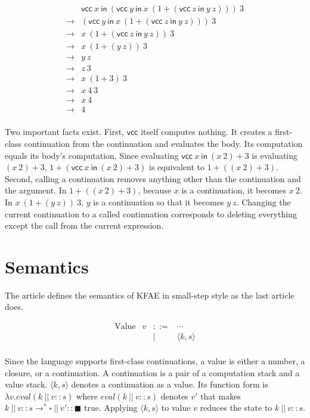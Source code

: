 \[
\begin{array}{cl}
& \textsf{vcc}\ x\ \textsf{in}\ (\textsf{vcc}\ y\ \textsf{in}\ x\
(1+(\textsf{vcc}\ z\ \textsf{in}\ y\ z)))\ 3 \\
\rightarrow & (\textsf{vcc}\ y\ \textsf{in}\ x\ (1+(\textsf{vcc}\ z\ \textsf{in}\
y\ z)))\ 3\\
\rightarrow & x\ (1+(\textsf{vcc}\ z\ \textsf{in}\ y\ z))\ 3\\
\rightarrow & x\ (1+(y\ z))\ 3 \\
\rightarrow & y\ z\\
\rightarrow & z\ 3 \\
\rightarrow & x\ (1+3)\ 3 \\
\rightarrow & x\ 4\ 3 \\
\rightarrow & x\ 4\\
\rightarrow & 4 \\
\end{array}
\]

Two important facts exist. First, $\textsf{vcc}$ itself computes nothing. It
creates a first-class continuation from the continuation and evaluates the body.
Its computation equals its body's computation. Since evaluating $\textsf{vcc}\ x\
\textsf{in}\ (x\ 2)+3$ is evaluating $(x\ 2)+3$, $1+(\textsf{vcc}\ x\
\textsf{in}\ (x\ 2)+3)$ is equivalent to $1+((x\ 2)+3)$. Second, calling a
continuation removes anything other than the continuation and the argument. In
$1+((x\ 2)+3)$, because $x$ is a continuation, it becomes $x\ 2$. In $x\ (1+(y\
z))\ 3$, $y$ is a continuation so that it becomes $y\ z$. Changing the current
continuation to a called continuation corresponds to deleting everything except
the call from the current expression.

\section{Semantics}

The article defines the semantics of KFAE in small-step style as the last article
does.

\[
\begin{array}{lrcl}
\text{Value} & v & ::= & \cdots \\
&& | & \langle k,s\rangle \\
\end{array}
\]

Since the language supports first-class continuations, a value is either a
number, a closure, or a continuation. A continuation is a pair of a computation
stack and a value stack. $\langle k,s\rangle$ denotes a continuation as a value.
Its function form is $\lambda v.\mathit{eval}(k\ ||\ v::s)$ where
$\mathit{eval}(k\ ||\ v::s)$ denotes $v'$ that makes $k\ ||\
v::s\rightarrow^\ast\square\ ||\ v'::\blacksquare$ true. Applying $\langle
k,s\rangle$ to value $v$ reduces the state to $k\ ||\ v::s$.

